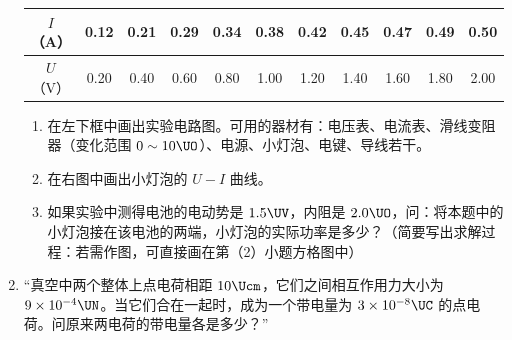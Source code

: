 \documentclass[\gkver]{gaokaozhenti}
\begin{document}
\begin{enumerate}
\begin{center}
\begin{tabular}{|c|c|c|c|c|c|c|c|c|c|c|}
\hline
$I$（A） & 0.12 & 0.21 & 0.29 & 0.34 & 0.38 & 0.42 & 0.45 & 0.47 & 0.49 & 0.50 \\
\hline
$U$（V） & 0.20 & 0.40 & 0.60 & 0.80 & 1.00 & 1.20 & 1.40 & 1.60 & 1.80 & 2.00 \\
\hline
\end{tabular}
\end{center}

\begin{enumerate}
	\item
	在左下框中画出实验电路图。可用的器材有：电压表、电流表、滑线变阻器（变化范围 $0\sim10\UO$）、电源、小灯泡、电键、导线若干。
	\item
	在右图中画出小灯泡的 $U-I$ 曲线。
	\item
	如果实验中测得电池的电动势是 $1.5\UV$，内阻是 $2.0\UO$，问：将本题中的小灯泡接在该电池的两端，小灯泡的实际功率是多少？（简要写出求解过程：若需作图，可直接画在第（2）小题方格图中）
\end{enumerate}



\item
“真空中两个整体上点电荷相距 $10\Ucm$，它们之间相互作用力大小为 $9\times10^{-4}\UN$。当它们合在一起时，成为一个带电量为 $3\times10^{-8}\UC$ 的点电荷。问原来两电荷的带电量各是多少？”


\end{enumerate}
\end{document}
